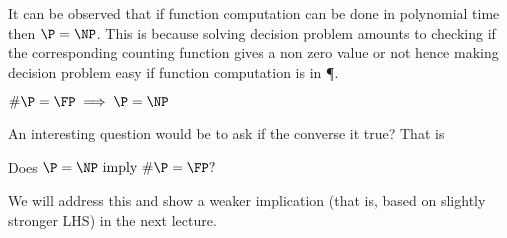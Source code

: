 \begin{figure}[htp!]
\centering
{}
\end{figure}

It can be observed that if function computation can be done in polynomial time
then $\P = \NP$. This is because solving decision problem amounts to checking
if the corresponding counting function gives a non zero value or not hence
making decision problem easy if function computation is in \P. 
\begin{lemma}
$\#\P = \FP \implies \P = \NP$
\end{lemma}

An interesting question would be to ask if the converse it true? That is 
\begin{center}
Does $\P = \NP \text{ imply }  \#\P = \FP ?$
\end{center}
We will address this and show a weaker implication (that is, based on slightly stronger LHS) in the next lecture.

